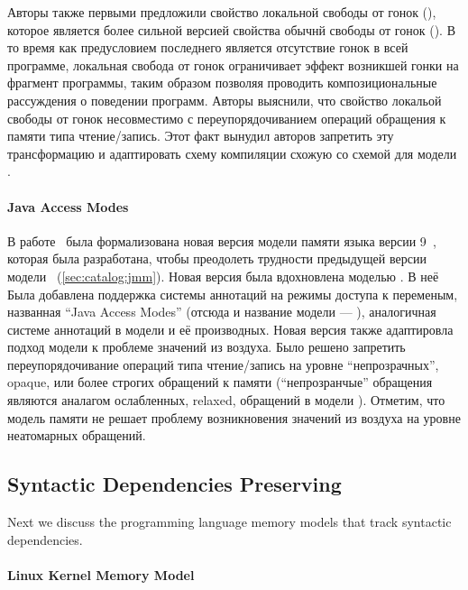 Авторы также первыми предложили свойство локальной свободы от гонок (\lDRF),
которое является более сильной версией свойства обычнй свободы от гонок (\eDRF).
В то время как предусловием последнего является отсутствие 
гонок в всей программе, локальная свобода от гонок 
ограничивает эффект возникшей гонки на фрагмент программы, 
таким образом позволяя проводить композициональные рассуждения 
о поведении программ. 
Авторы выяснили, что свойство локальой свободы от гонок 
несовместимо с переупорядочиванием операций обращения к памяти типа чтение/запись.  
Этот факт вынудил авторов запретить эту трансформацию 
и адаптировать схему компиляции схожую со схемой для модели \RCMM. 

\paragraph{Java Access Modes}

В работе~\cite{Bender-Palsberg:OOPSLA19} была формализована 
новая версия модели памяти языка \Java версии 9~\cite{JDK9-VarHandle, JEP:193, JDK9-Modes}, 
которая была разработана, чтобы преодолеть трудности 
предыдущей версии модели~\cite{Manson-al:POPL05} 
(\see \ref{sec:catalog:jmm}).
Новая версия была вдохновлена моделью \RCMM.
В неё Была добавлена поддержка системы аннотаций на режимы доступа к переменым, 
названная ``Java Access Modes'' (отсюда и название модели --- \JAM),
аналогичная системе аннотаций в модели \CMM и её производных. 
Новая версия также адаптировла подход модели \RCMM к 
проблеме значений из воздуха. 
Было решено запретить переупорядочивание операций типа чтение/запись 
на уровне ``непрозрачных'', opaque, или более строгих обращений к памяти
(``непрозранчые'' обращения являются аналагом ослабленных, relaxed, 
обращений в модели \CPP).
Отметим, что модель памяти \JAM не решает проблему возникновения значений 
из воздуха на уровне неатомарных обращений. 

\subsection{Syntactic Dependencies Preserving}
\label{sec:catalog:deprf}

Next we discuss the programming language memory models 
that track syntactic dependencies.

\paragraph{Linux Kernel Memory Model}

